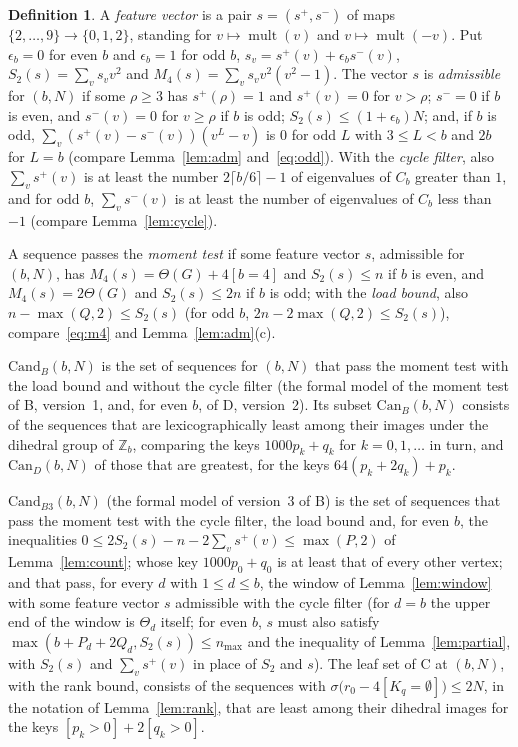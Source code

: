 \documentclass[11pt]{article}
\theoremstyle{definition}
\newtheorem*{definition}{Definition}
\theoremstyle{remark}
\DeclareMathOperator{\mult}{mult}
\newcommand{\Z}{\mathbb Z}
\begin{document}
\begin{definition}
A \emph{feature vector} is a pair $s=(s^+,s^-)$ of maps
$\{2,\dots,9\}\to\{0,1,2\}$, standing for $v\mapsto\mult(v)$ and
$v\mapsto\mult(-v)$. Put $\epsilon_b=0$ for even $b$ and $\epsilon_b=1$ for odd
$b$, $s_v=s^+(v)+\epsilon_bs^-(v)$, $S_2(s)=\sum_vs_vv^2$ and
$M_4(s)=\sum_vs_vv^2(v^2-1)$. The vector $s$ is \emph{admissible} for $(b,N)$
if some $\rho\ge3$ has $s^+(\rho)=1$ and $s^+(v)=0$ for $v>\rho$; $s^-=0$ if $b$
is even, and $s^-(v)=0$ for $v\ge\rho$ if $b$ is odd; $S_2(s)\le(1+\epsilon_b)N$;
and, if $b$ is odd, $\sum_v(s^+(v)-s^-(v))(v^L-v)$ is $0$ for odd $L$ with
$3\le L<b$ and $2b$ for $L=b$ (compare Lemma~\ref{lem:adm}
and~\eqref{eq:odd}). With the \emph{cycle filter}, also $\sum_vs^+(v)$ is at
least the number $2\lceil b/6\rceil-1$ of eigenvalues of $C_b$ greater than
$1$, and for odd $b$, $\sum_vs^-(v)$ is at least the number of eigenvalues of
$C_b$ less than $-1$ (compare Lemma~\ref{lem:cycle}).

A sequence passes the \emph{moment test} if some feature vector $s$,
admissible for $(b,N)$, has $M_4(s)=\Theta(G)+4[b=4]$ and
$S_2(s)\le n$ if $b$ is even, and $M_4(s)=2\Theta(G)$ and $S_2(s)\le2n$ if $b$
is odd; with the \emph{load bound}, also $n-\max(Q,2)\le S_2(s)$ (for odd $b$,
$2n-2\max(Q,2)\le S_2(s)$), compare~\eqref{eq:m4} and
Lemma~\ref{lem:adm}(c).

$\mathrm{Cand}_B(b,N)$ is the set of sequences for $(b,N)$ that pass the moment
test with the load bound and without the cycle filter (the formal model of the
moment test of B, version~1, and, for even $b$, of D, version~2). Its subset
$\mathrm{Can}_B(b,N)$ consists of the sequences that are lexicographically
least among their images under the dihedral group of $\Z_b$, comparing the
keys $1000p_k+q_k$ for $k=0,1,\dots$ in turn, and $\mathrm{Can}_D(b,N)$ of
those that are greatest, for the keys $64(p_k+2q_k)+p_k$.

$\mathrm{Cand}_{B3}(b,N)$ (the formal model of version~3 of B) is the set of sequences that pass
the moment test with the cycle filter, the load bound and, for even $b$, the
inequalities $0\le2S_2(s)-n-2\sum_vs^+(v)\le\max(P,2)$ of
Lemma~\ref{lem:count}; whose key $1000p_0+q_0$ is at least that of every
other vertex; and that pass, for every $d$ with $1\le d\le b$, the window of
Lemma~\ref{lem:window} with some feature vector $s$ admissible with the cycle
filter (for $d=b$ the upper end of the window is $\Theta_d$ itself; for even $b$, $s$ must also satisfy
$\max(b+P_d+2Q_d,S_2(s))\le n_{\max}$ and the inequality of
Lemma~\ref{lem:partial}, with $S_2(s)$ and $\sum_vs^+(v)$ in place of $S_2$ and
$s$). The leaf set of C at $(b,N)$, with the rank bound, consists of
the sequences with $\sigma\bigl(r_0-4[K_q=\emptyset]\bigr)\le2N$, in the
notation of Lemma~\ref{lem:rank}, that are least among their dihedral images
for the keys $[p_k>0]+2[q_k>0]$.
\end{definition}
\end{document}
